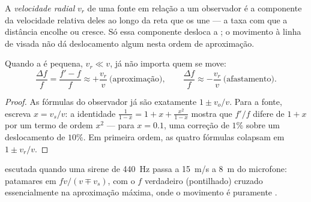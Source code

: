 \begin{definition}\label{def:g12:doppler-effect:radial}
A \emph{velocidade radial} $v_r$ de uma fonte em
relação a um observador é a componente da velocidade relativa deles ao
longo da reta que os une --- a taxa com que a distância encolhe ou
cresce. Só essa componente desloca a ; o movimento
\emph{} à linha de visada não dá deslocamento algum nesta
ordem de aproximação.
\end{definition}

\begin{proposition}\label{prop:g12:doppler-effect:slow}
Quando a  é pequena, $v_r \ll v$, já não importa quem se
move:
\[
\frac{\Delta f}{f} = \frac{f' - f}{f} \approx +\frac{v_r}{v} \ \text{(aproximação)},
\qquad
\frac{\Delta f}{f} \approx -\frac{v_r}{v} \ \text{(afastamento)}.
\]
\end{proposition}

\begin{proof}
As fórmulas do observador já são exatamente $1 \pm v_o/v$. Para a fonte,
escreva $x = v_s/v$: a identidade
$\frac{1}{1 - x} = 1 + x + \frac{x^2}{1 - x}$ mostra que $f'/f$ difere de
$1 + x$ por um termo de ordem $x^2$ --- para $x = 0.1$, uma correção de
$1\%$ sobre um deslocamento de $10\%$. Em primeira ordem, as quatro
fórmulas colapsam em $1 \pm v_r/v$.
\end{proof}

\begin{omfigure}

{\small {} escutada quando uma sirene de \qty{440}{Hz} passa a
\qty{15}{m/s} a \qty{8}{m} do microfone: patamares em
$fv/(v \mp v_s)$, com o $f$ verdadeiro (pontilhado) cruzado
essencialmente na aproximação máxima, onde o movimento é puramente
.}
\end{omfigure}

